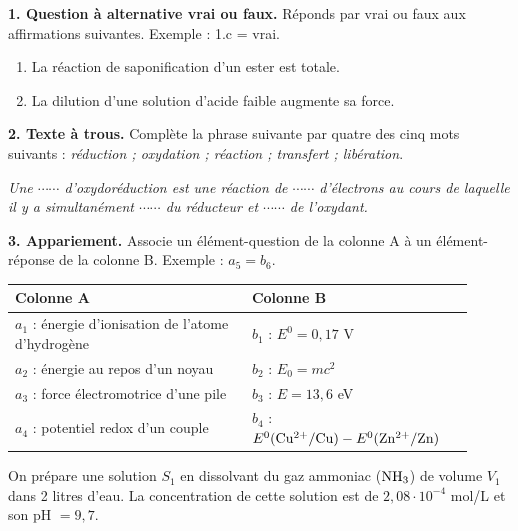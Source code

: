 \documentclass[11pt]{article}
\begin{document}



\noindent\textbf{1. Question à alternative vrai ou faux.} Réponds par vrai ou faux aux affirmations suivantes. Exemple : 1.c = vrai.
\begin{enumerate}[label=1.\alph*.]
  \item La réaction de saponification d'un ester est totale.
  \item La dilution d'une solution d'acide faible augmente sa force.
\end{enumerate}

\medskip
\noindent\textbf{2. Texte à trous.} Complète la phrase suivante par quatre des cinq mots suivants : \textit{réduction ; oxydation ; réaction ; transfert ; libération}.

\textit{Une $\cdots\cdots$ d'oxydoréduction est une réaction de $\cdots\cdots$ d'électrons au cours de laquelle il y a simultanément $\cdots\cdots$ du réducteur et $\cdots\cdots$ de l'oxydant.}

\medskip
\noindent\textbf{3. Appariement.} Associe un élément-question de la colonne A à un élément-réponse de la colonne B. Exemple : $a_5 = b_6$.

\begin{center}\renewcommand{\arraystretch}{1.5}
\begin{tabular}{|p{0.47\linewidth}|p{0.44\linewidth}|}
\hline
\textbf{Colonne A} & \textbf{Colonne B} \\
\hline
$a_1$ : énergie d'ionisation de l'atome d'hydrogène & $b_1$ : $E^0 = 0{,}17$ V \\
\hline
$a_2$ : énergie au repos d'un noyau & $b_2$ : $E_0 = mc^2$ \\
\hline
$a_3$ : force électromotrice d'une pile & $b_3$ : $E = 13{,}6$ eV \\
\hline
$a_4$ : potentiel redox d'un couple & $b_4$ : $E^0(\mathrm{Cu^{2+}/Cu}) - E^0(\mathrm{Zn^{2+}/Zn})$ \\
\hline
\end{tabular}
\end{center}

On prépare une solution $S_1$ en dissolvant du gaz ammoniac ($\mathrm{NH_3}$) de volume $V_1$ dans 2 litres d'eau. La concentration de cette solution est de $2{,}08\cdot10^{-4}$ mol/L et son pH $= 9{,}7$.
\end{document}
